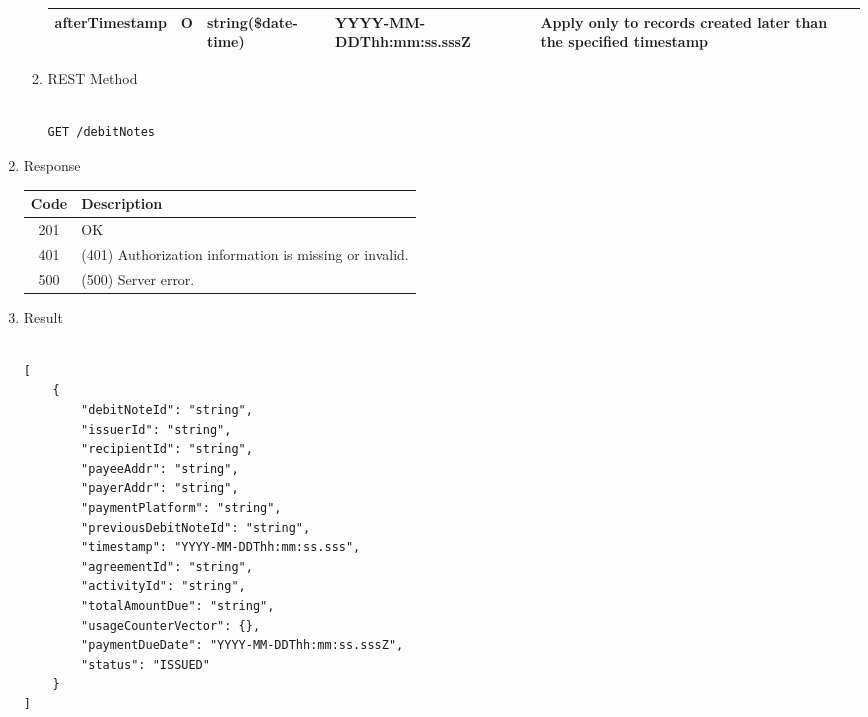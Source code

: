 \begin{enumerate}
\begin{enumerate}
\begin{table}[H]
\begin{center}
\begin{tabular}{|p{3cm}|l|p{3cm}|p{3cm}|p{4cm}|}
afterTimestamp			& O &	string(\$date-time)	&	YYYY-MM-DDThh:mm:ss.sssZ	&	Apply only to records created later than the specified timestamp \\
\hline

\end{tabular}
\end{center}
\end{table}


\item REST Method

\begin{tcolorbox}[boxrule=0pt, frame empty]
\begin{verbatim} 

GET /debitNotes

\end{verbatim}
\end{tcolorbox}

\end{enumerate}

\item Response

\begin{table}[H]
\footnotesize
\begin{center}
\begin{tabular}{|c|l|} 
\hline
\rowcolor{lightgray}	Code 		& 	Description \\
\hline
201	 		&	OK \\
\hline
401			&	(401) Authorization information is missing or invalid. \\
\hline
500			&	(500) Server error. \\
\hline
\end{tabular}
\end{center}
\end{table}

\item Result

\begin{tcolorbox}[boxrule=0pt, frame empty]
\begin{verbatim}

[
	{
		"debitNoteId": "string",
		"issuerId": "string",
		"recipientId": "string",
		"payeeAddr": "string",
		"payerAddr": "string",
		"paymentPlatform": "string",
		"previousDebitNoteId": "string",
		"timestamp": "YYYY-MM-DDThh:mm:ss.sss",
		"agreementId": "string",
		"activityId": "string",
		"totalAmountDue": "string",
		"usageCounterVector": {},
		"paymentDueDate": "YYYY-MM-DDThh:mm:ss.sssZ",
		"status": "ISSUED"
	}
]

\end{verbatim}
\end{tcolorbox}


\end{enumerate}
